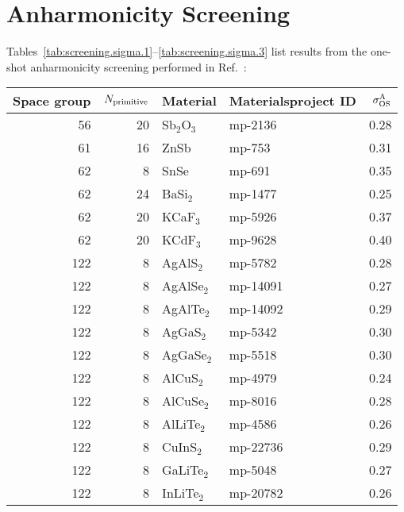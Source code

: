 \chapter{Anharmonicity Screening}
\label{sec:app.screening}

Tables~\ref{tab:screening.sigma.1}--\ref{tab:screening.sigma.3} list results from the one-shot anharmonicity screening performed in Ref.~\cite{Knoop.2020}:

\begin{table}[h!]
\small
\begin{tabular}{rrllr}
\toprule
 Space group &  $N_{\rm primitive}$ & Material & Materialsproject ID &  $\sigma^\mathrm{A}_\mathrm{OS}$ \\
\midrule
          56 &           20 &  Sb$_2$O$_3$ &    mp-2136 &       0.28 \\
          61 &           16 &         ZnSb &     mp-753 &       0.31 \\
          62 &            8 &         SnSe &     mp-691 &       0.35 \\
          62 &           24 &     BaSi$_2$ &    mp-1477 &       0.25 \\
          62 &           20 &     KCaF$_3$ &    mp-5926 &       0.37 \\
          62 &           20 &     KCdF$_3$ &    mp-9628 &       0.40 \\
         122 &            8 &    AgAlS$_2$ &    mp-5782 &       0.28 \\
         122 &            8 &   AgAlSe$_2$ &   mp-14091 &       0.27 \\
         122 &            8 &   AgAlTe$_2$ &   mp-14092 &       0.29 \\
         122 &            8 &    AgGaS$_2$ &    mp-5342 &       0.30 \\
         122 &            8 &   AgGaSe$_2$ &    mp-5518 &       0.30 \\
         122 &            8 &    AlCuS$_2$ &    mp-4979 &       0.24 \\
         122 &            8 &   AlCuSe$_2$ &    mp-8016 &       0.28 \\
         122 &            8 &   AlLiTe$_2$ &    mp-4586 &       0.26 \\
         122 &            8 &    CuInS$_2$ &   mp-22736 &       0.29 \\
         122 &            8 &   GaLiTe$_2$ &    mp-5048 &       0.27 \\
         122 &            8 &   InLiTe$_2$ &   mp-20782 &       0.26 \\

\end{tabular}
\end{table}
